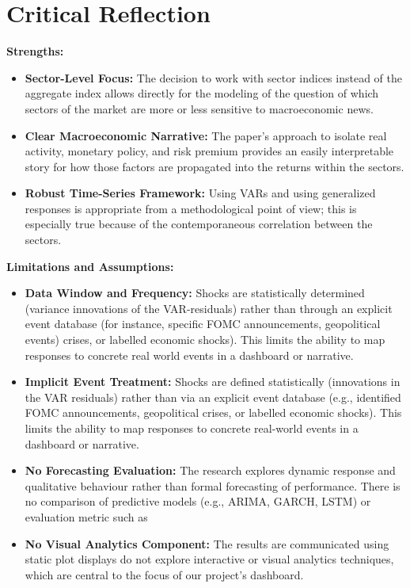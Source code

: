 \documentclass{article}
\begin{document}
\section{Critical Reflection}

\noindent \textbf{Strengths:}

\begin{itemize}
    \item \textbf{Sector-Level Focus:}  
    The decision to work with sector indices instead of the aggregate index allows directly for the modeling of the question of which sectors of the market are more or less sensitive to macroeconomic news.
    
    \item \textbf{Clear Macroeconomic Narrative:}  
    The paper's approach to isolate real activity, monetary policy, and risk premium provides an easily interpretable story for how those factors are propagated into the returns within the sectors.
    
    \item \textbf{Robust Time-Series Framework:}  
    Using VARs and using generalized responses is appropriate from a methodological point of view; this is especially true because of the contemporaneous correlation between the sectors.
\end{itemize}

\vspace{0.5em}

\noindent \textbf{Limitations and Assumptions:}

\begin{itemize}
    \item \textbf{Data Window and Frequency:}  
    Shocks are statistically determined (variance innovations of the VAR-residuals) rather than through an explicit event database (for instance, specific FOMC announcements, geopolitical events) crises, or labelled economic shocks). This limits the ability to map responses to concrete real world events in a dashboard or narrative.
    
    \item \textbf{Implicit Event Treatment:}  
    Shocks are defined statistically (innovations in the VAR residuals) rather than via an explicit event database (e.g., identified FOMC announcements, geopolitical crises, or labelled economic shocks). This limits the ability to map responses to concrete real-world events in a dashboard or narrative.
    
    \item \textbf{No Forecasting Evaluation:}  
    The research explores dynamic response and qualitative behaviour rather than formal forecasting of performance. There is no comparison of predictive models (e.g., ARIMA, GARCH, LSTM) or evaluation metric such as
    
    \item \textbf{No Visual Analytics Component:}  
    The results are communicated using static plot displays do not explore interactive or visual analytics techniques, which are central to the focus of our project’s dashboard.
\end{itemize}
\end{document}
